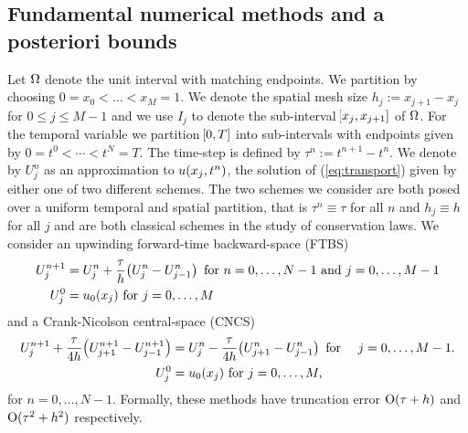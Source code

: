 \documentclass[final]{amsart}
\numberwithin{equation}{section}
\begin{document}
\subsection{Fundamental numerical methods and a posteriori bounds}\label{sec:example_aposteriori_bounds}

Let $\Omega$ denote the unit interval with matching endpoints. We
partition by choosing $0=x_0< \dots < x_{M}=1$. We denote the spatial
mesh size $ h_j := x_{j+1} - x_{j}$ for $0\leq j\leq M-1$ and we use
$I_j$ to denote the sub-interval $\!\left[{x_{j},x_{j+1}}\right]$ of $\Omega$. For the
temporal variable we partition $\!\left[{0,T}\right]$ into sub-intervals with
endpoints given by $0=t^0<\cdots<t^N=T$.  The time-step is defined by
$\tau^n:=t^{n+1}-t^n$. We denote by $U^n_j$ as an approximation to $
u\!\left({x_j, t^n}\right)$, the solution of (\ref{eq:transport}) given by either
one of two different schemes. The two schemes we consider are both
posed over a uniform temporal and spatial partition, that is $\tau^n
\equiv \tau$ for all $n$ and $h_j\equiv h$ for all $j$ and are both
classical schemes in the study of conservation laws. We consider an
upwinding forward-time backward-space (FTBS)
\begin{equation}
\label{eq:FTBS}
\begin{split}
U^{n+1}_j &= U^n_j + \frac{\tau}{h} \!\left({U^n_{j} - U^n_{j-1}}\right)
\text{ for } n=0,\dots, N-1 \text{ and } j=0,\dots, M-1
\\
U^0_j &= u_0(x_j) \text{ for } j=0, \dots, M
\end{split}
\end{equation}
and a Crank-Nicolson central-space (CNCS)
\begin{equation}
  \label{eq:FTCS}
  \begin{split}
    U^{n+1}_j
    + \frac{\tau}{4h}
    \!\left({U^{n+1}_{j+1}-U^{n+1}_{j-1}}\right)
      &=
    U^n_j
    - \frac{\tau}{4h}
    \!\left({U^n_{j+1}-U^n_{j-1}}\right)  
\text{ for } \quad j=0,\dots, M-1.
\\
U^0_j &= u_0(x_j) \text{ for } j=0, \dots, M,
\end{split}
\end{equation}
for $n=0,\dots,N-1$.
Formally, these methods have truncation error $\operatorname{O}(\tau + h)$ and
$\operatorname{O}(\tau^2 + h^2)$ respectively.

\end{document}
